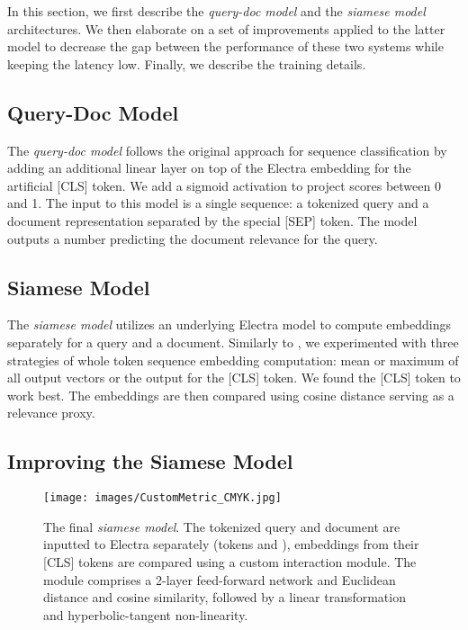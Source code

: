 \documentclass[letterpaper]{article} \usepackage{aaai22 }  \usepackage{times}  \usepackage{helvet}  \usepackage{courier}  \usepackage[hyphens]{url}  \usepackage{graphicx} \usepackage{amsmath,amsfonts,amssymb, mathabx,bm,bbm}
\begin{document}
In this section, we first describe the \textit{query-doc model} and the \textit{siamese model} architectures. We then elaborate on a set of improvements applied to the latter model to decrease the gap between the performance of these two systems while keeping the latency low. Finally, we describe the training details. 

\subsection{Query-Doc Model}

The \textit{query-doc model} follows the original approach for sequence classification  \cite{bert} by adding an additional linear layer on top of the Electra embedding for the artificial [CLS] token. We add a sigmoid activation to project scores between 0 and 1. The input to this  model is a single sequence: a tokenized query and a document representation separated by the special [SEP] token. The model outputs a number predicting the document relevance for the query.

\subsection{Siamese Model}

The \textit{siamese model} utilizes an underlying Electra model to compute embeddings separately for a query and a document. Similarly to \citet{sentence_bert}, we experimented with three strategies of whole token sequence embedding computation: mean or maximum of all output vectors or the output for the [CLS] token. We found the [CLS] token to work best. The embeddings are then compared using cosine distance serving as a relevance proxy.

\subsection{Improving the Siamese Model}

\begin{figure}[!htb]
    \centering
    \texttt{[image: images/CustomMetric\_CMYK.jpg]}
    \caption{The final \textit{siamese model}. The tokenized query and document are inputted to Electra separately (tokens  and ), embeddings from their [CLS] tokens are compared using a custom interaction module. The module comprises a 2-layer feed-forward network and Euclidean distance and cosine similarity, followed by a linear transformation and hyperbolic-tangent non-linearity.}
    \label{fig:my_label}
\end{figure}
\end{document}
